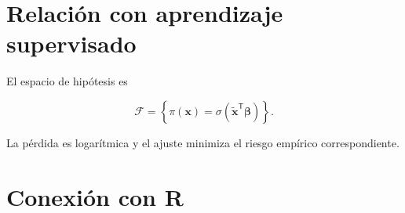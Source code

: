 \documentclass[
  spanish,
  11pt,
  letterpaper,
  DIV=11,
  numbers=noendperiod]{scrreprt}
\theoremstyle{definition}
\theoremstyle{plain}
\theoremstyle{definition}
\theoremstyle{remark}
\begin{document}
\section{Relación con aprendizaje
supervisado}\label{relaciuxf3n-con-aprendizaje-supervisado-2}

El espacio de hipótesis es

\[
\mathcal{F}
=
\left\{
\pi(\mathbf{x})
=
\sigma
\left(
\widetilde{\mathbf{x}}^{\mathsf T}\boldsymbol{\beta}
\right)
\right\}.
\]

La pérdida es logarítmica y el ajuste minimiza el riesgo empírico
correspondiente.

\section{Conexión con R}\label{conexiuxf3n-con-r-10}
\end{document}
